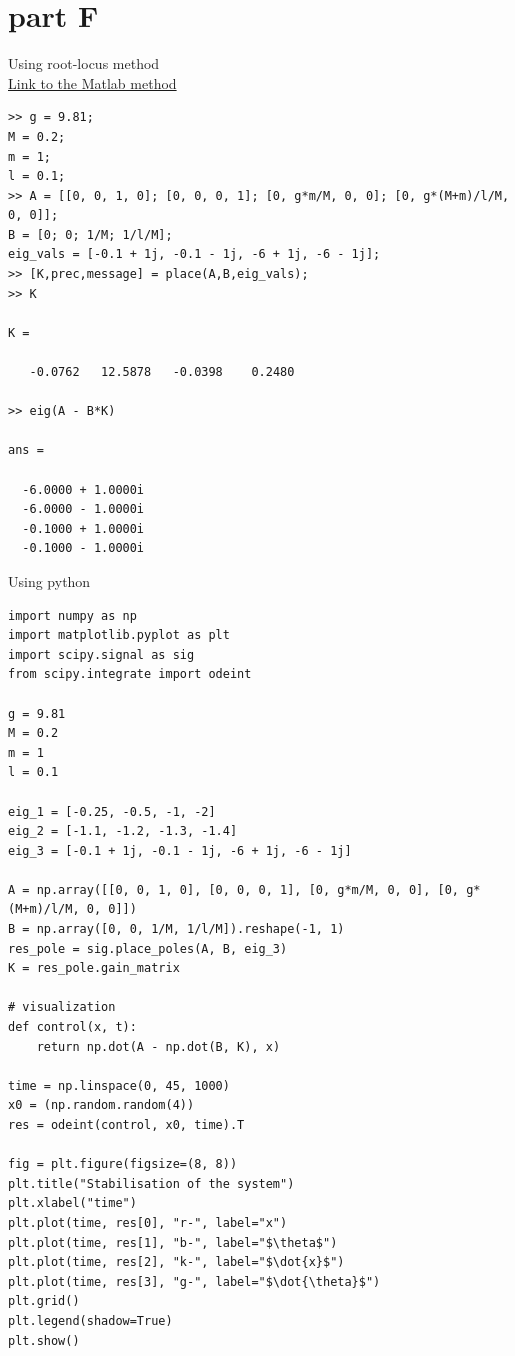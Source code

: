 \documentclass[a4paper,11pt]{article}
\makeatletter
\newcommand{\problemquestion}[1]{\gdef\@problemquestion{#1}}%
\newcommand{\problemsolution}[1]{\gdef\@problemsolution{#1}}%
\theoremstyle{mytheor}
\makeatother
\begin{document}
\section*{part F}
\begin{problem}
  \problemquestion{(for the controllable system) design state feedback controller for lin- earized system using pole placement method. Assess the performance of the controller for variety of initial conditions. Justify the choice of initial conditions. Solve the task by two ways: using root-locus and with python. Compare them;}
  \problemsolution{Initial conditions were chosen such that system will converge with different speed to demonstrate how controller will act}
\end{problem}

Using root-locus method \\
\href{https://www.mathworks.com/help/control/ref/place.html}{Link to the Matlab method}
\begin{lstlisting}
>> g = 9.81;
M = 0.2;
m = 1;
l = 0.1;
>> A = [[0, 0, 1, 0]; [0, 0, 0, 1]; [0, g*m/M, 0, 0]; [0, g*(M+m)/l/M, 0, 0]];
B = [0; 0; 1/M; 1/l/M];
eig_vals = [-0.1 + 1j, -0.1 - 1j, -6 + 1j, -6 - 1j];
>> [K,prec,message] = place(A,B,eig_vals);
>> K

K =

   -0.0762   12.5878   -0.0398    0.2480

>> eig(A - B*K)

ans =

  -6.0000 + 1.0000i
  -6.0000 - 1.0000i
  -0.1000 + 1.0000i
  -0.1000 - 1.0000i
\end{lstlisting}

Using python
\begin{lstlisting}[label={list:first}]
import numpy as np
import matplotlib.pyplot as plt
import scipy.signal as sig
from scipy.integrate import odeint

g = 9.81
M = 0.2
m = 1
l = 0.1

eig_1 = [-0.25, -0.5, -1, -2]
eig_2 = [-1.1, -1.2, -1.3, -1.4]
eig_3 = [-0.1 + 1j, -0.1 - 1j, -6 + 1j, -6 - 1j]

A = np.array([[0, 0, 1, 0], [0, 0, 0, 1], [0, g*m/M, 0, 0], [0, g*(M+m)/l/M, 0, 0]])
B = np.array([0, 0, 1/M, 1/l/M]).reshape(-1, 1)
res_pole = sig.place_poles(A, B, eig_3)
K = res_pole.gain_matrix

# visualization
def control(x, t):
    return np.dot(A - np.dot(B, K), x)

time = np.linspace(0, 45, 1000)   
x0 = (np.random.random(4)) 
res = odeint(control, x0, time).T

fig = plt.figure(figsize=(8, 8))
plt.title("Stabilisation of the system")
plt.xlabel("time")
plt.plot(time, res[0], "r-", label="x")
plt.plot(time, res[1], "b-", label="$\theta$")
plt.plot(time, res[2], "k-", label="$\dot{x}$")
plt.plot(time, res[3], "g-", label="$\dot{\theta}$")
plt.grid()
plt.legend(shadow=True)
plt.show()
\end{lstlisting}
\end{document}
